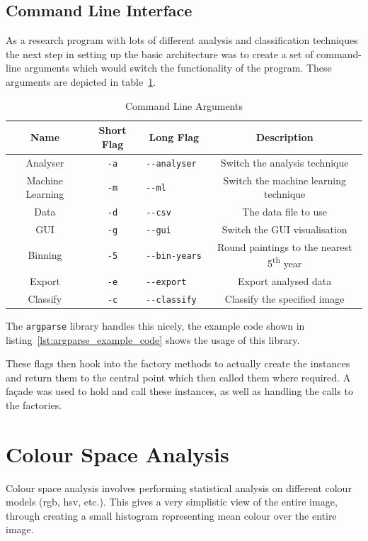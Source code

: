 \subsection{Command Line Interface}
As a research program with lots of different analysis and classification techniques the next step
in setting up the basic architecture was to create a set of command-line arguments which would
switch the functionality of the program. These arguments are depicted in table~\ref{tab:args}.

\begin{table}[h]
\centering
\begin{tabular}{|c|c|c|c|} \hline
Name             & Short Flag & Long Flag         & Description\\\hline
Analyser         & \verb+-a+  & \verb+--analyser  +& Switch the analysis technique\\
Machine Learning & \verb+-m+  & \verb+--ml        +& Switch the machine learning technique\\
Data             & \verb+-d+  & \verb+--csv       +& The data file to use\\
GUI              & \verb+-g+  & \verb+--gui       +& Switch the GUI visualisation\\
Binning          & \verb+-5+  & \verb+--bin-years +& Round paintings to the nearest 5\textsuperscript{th} year\\
Export           & \verb+-e+  & \verb+--export    +& Export analysed data\\
Classify         & \verb+-c+  & \verb+--classify  +& Classify the specified image\\
\hline
\end{tabular}
\caption{Command Line Arguments}\label{tab:args}
\end{table}

The \texttt{argparse} library handles this nicely, the example code shown in 
listing~\ref{lst:argparse_example_code} shows the usage of this library.

These flags then hook into the factory methods to actually create the instances and return them to
the central point which then called them where required. A 
fa\c{c}ade\cite[p.185-194]{Gamma1996Design} was used to hold and call these instances, as well as
handling the calls to the factories.


\section{Colour Space Analysis}
Colour space analysis involves performing statistical analysis on different colour models 
(\gls{rgb}, \gls{hsv}, etc.). This gives a very simplistic view of the entire image, through 
creating a small histogram representing mean colour over the entire image.

